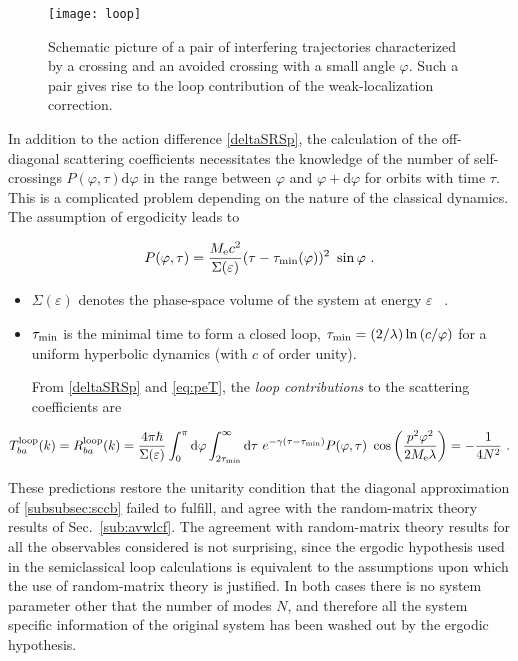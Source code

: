 \documentclass[a4paper,10pt]{article}
\newcommand{\dif}{\mathrm{d}}
\newcommand{\nin}{\noindent}
\def\Me{M_{\rm e}}
\newcommand{\be}{\begin{equation}}
\newcommand{\ee}{\end{equation}}
\begin{document}
\begin{figure}
\setlength{\unitlength}{1mm}
\centerline{\texttt{[image: loop]}}
\caption{
Schematic picture of a pair of interfering trajectories characterized by a crossing and an avoided crossing with a small angle $\varphi$. Such a pair gives rise to the loop contribution of the weak-localization correction.
}
\label{fig:loop}
\end{figure}

\nin In addition to the action difference \eqref{deltaSRSp}, the calculation of the off-diagonal scattering coefficients necessitates the knowledge of the number of self-crossings $P(\varphi,\tau)\dif \varphi$ in the range between $\varphi$ and $\varphi+\dif \varphi$ for orbits with time $\tau$. This is a complicated problem depending on the nature of the classical dynamics. The assumption of ergodicity leads to \cite{Richter2002}

\be
P(\varphi,\tau) = \frac{\Me c^2}{\Sigma(\varepsilon)} (\tau-\tau_{\rm min}(\varphi))^2 \ \sin{\varphi} \ .
\label{eq:peT}
\ee

\begin{itemize}

\item $\Sigma(\varepsilon)$ denotes the phase-space volume of the system at energy $\varepsilon$ \ .

\item $\tau_{\rm min}$ is the minimal time to form a closed loop, $\tau_{\rm min}=(2/\lambda) \ln{(c/\varphi)}$ for a uniform hyperbolic dynamics (with $c$ of order unity).  

\nin From \eqref{deltaSRSp} and \eqref{eq:peT}, the {\it loop contributions} to the scattering coefficients are \cite{Richter2002}

\end{itemize} 

\be
T_{ba}^{\rm loop}(k) = R_{ba}^{\rm loop}(k) =
\frac{4\pi \hbar}{\Sigma(\varepsilon)} \int_{0}^{\pi} \dif \varphi
\int_{2 \tau_{\rm min}}^{\infty} \dif \tau \ e^{-\gamma(\tau-\tau_{\rm min})} P(\varphi,\tau) \ \cos{\left(\frac{p^2 \varphi^2}{2\Me \lambda}\right)} = 
- \frac{1}{4N^2}  \ .
\label{eq:loopT} 
\ee

\nin These predictions restore the unitarity condition that the diagonal approximation of \ref{subsubsec:sccb} failed to fulfill, and agree with the random-matrix theory results of Sec.~\ref{sub:avwlcf}. The agreement with random-matrix theory results for all the observables considered is not surprising, since the ergodic hypothesis used in the semiclassical loop calculations is equivalent to the assumptions upon which the use of 
random-matrix theory is justified. In both cases there is no system parameter other that the number of modes $N$, and therefore all the system specific information of the original system has been washed out by the ergodic hypothesis.  
\end{document}
